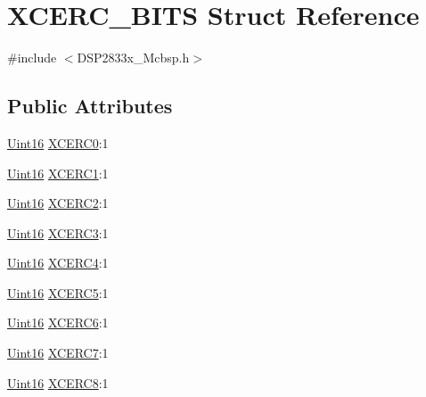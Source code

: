 \hypertarget{struct_x_c_e_r_c___b_i_t_s}{}\section{X\+C\+E\+R\+C\+\_\+\+B\+I\+T\+S Struct Reference}
\label{struct_x_c_e_r_c___b_i_t_s}


{\ttfamily \#include $<$D\+S\+P2833x\+\_\+\+Mcbsp.\+h$>$}

\subsection*{Public Attributes}
\begin{DoxyCompactItemize}
\item 
\hyperlink{_d_s_p2833x___device_8h_a59a9f6be4562c327cbfb4f7e8e18f08b}{Uint16} \hyperlink{struct_x_c_e_r_c___b_i_t_s_a5e56b471be0cde43bf806f965b86e54a}{X\+C\+E\+R\+C0}\+:1
\item 
\hyperlink{_d_s_p2833x___device_8h_a59a9f6be4562c327cbfb4f7e8e18f08b}{Uint16} \hyperlink{struct_x_c_e_r_c___b_i_t_s_ac5a5a49fae1c4693a0152ac97938ee9c}{X\+C\+E\+R\+C1}\+:1
\item 
\hyperlink{_d_s_p2833x___device_8h_a59a9f6be4562c327cbfb4f7e8e18f08b}{Uint16} \hyperlink{struct_x_c_e_r_c___b_i_t_s_ad80aa7922e4f4a570c35b56453aa7a57}{X\+C\+E\+R\+C2}\+:1
\item 
\hyperlink{_d_s_p2833x___device_8h_a59a9f6be4562c327cbfb4f7e8e18f08b}{Uint16} \hyperlink{struct_x_c_e_r_c___b_i_t_s_a6bbafb78fda312891f2d2c906dbf7038}{X\+C\+E\+R\+C3}\+:1
\item 
\hyperlink{_d_s_p2833x___device_8h_a59a9f6be4562c327cbfb4f7e8e18f08b}{Uint16} \hyperlink{struct_x_c_e_r_c___b_i_t_s_a2a1810a62aa23cbb819c7f0e07c51a92}{X\+C\+E\+R\+C4}\+:1
\item 
\hyperlink{_d_s_p2833x___device_8h_a59a9f6be4562c327cbfb4f7e8e18f08b}{Uint16} \hyperlink{struct_x_c_e_r_c___b_i_t_s_a6ae3d2b18e37460f7597d6fa94f0c77b}{X\+C\+E\+R\+C5}\+:1
\item 
\hyperlink{_d_s_p2833x___device_8h_a59a9f6be4562c327cbfb4f7e8e18f08b}{Uint16} \hyperlink{struct_x_c_e_r_c___b_i_t_s_ab2456bfac1d176774b1b0816cf9858c4}{X\+C\+E\+R\+C6}\+:1
\item 
\hyperlink{_d_s_p2833x___device_8h_a59a9f6be4562c327cbfb4f7e8e18f08b}{Uint16} \hyperlink{struct_x_c_e_r_c___b_i_t_s_a8e0745723e9d7d02532ffc40dc9f5aa2}{X\+C\+E\+R\+C7}\+:1
\item 
\hyperlink{_d_s_p2833x___device_8h_a59a9f6be4562c327cbfb4f7e8e18f08b}{Uint16} \hyperlink{struct_x_c_e_r_c___b_i_t_s_a11824d0102b44812d96cf138835f0b00}{X\+C\+E\+R\+C8}\+:1

\end{DoxyCompactItemize}
